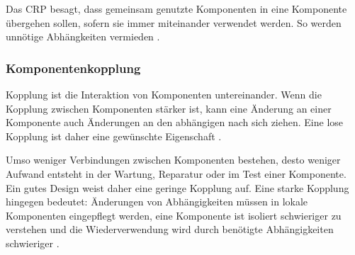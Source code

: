 
Das \ac{CRP} besagt, dass gemeinsam genutzte Komponenten in eine Komponente übergehen sollen, sofern sie immer miteinander verwendet werden. So werden unnötige Abhängkeiten vermieden \citep[vgl.][107]{martin2018}.


 

\subsubsection{Komponentenkopplung}

Kopplung ist die Interaktion von Komponenten untereinander. Wenn die Kopplung zwischen Komponenten stärker ist, kann eine Änderung an einer Komponente auch Änderungen an den abhängigen nach sich ziehen. Eine lose Kopplung ist daher eine gewünschte Eigenschaft \citep[vgl.][797]{gui2009}.


Umso weniger Verbindungen zwischen Komponenten bestehen, desto weniger Aufwand entsteht in der Wartung, Reparatur oder im Test einer Komponente. Ein gutes Design weist daher eine geringe Kopplung auf. Eine starke Kopplung hingegen bedeutet: Änderungen von Abhängigkeiten müssen in lokale Komponenten eingepflegt werden, eine Komponente ist isoliert schwieriger zu verstehen und die Wiederverwendung wird durch benötigte Abhängigkeiten schwieriger \citep[vgl.][130]{voorhees2020}.

